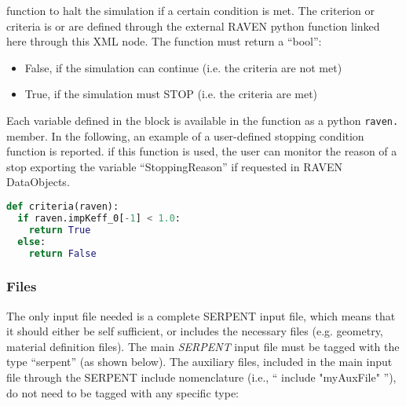 \begin{itemize}
                                                            function to halt the simulation if a certain condition is
                                                            met. The criterion or criteria is or are defined through the external RAVEN python function linked here through this XML node. 
                                                            The function must return a ``bool'':
                                                            \begin{itemize}
                                                              \item False, if the simulation can continue (i.e. the criteria are not met)
                                                              \item True, if the simulation must STOP (i.e. the criteria are met)
                                                            \end{itemize}
                                                            Each variable defined in the  block is available in the
                                                            function as a python \texttt{raven.} member. In the following, an example of a
                                                            user-defined stopping condition function is reported.
                                                            \nb if this function is used, the user can monitor the reason of a stop exporting the variable ``StoppingReason'' if requested in RAVEN DataObjects.
                                                            
\begin{lstlisting}[language=python]
def criteria(raven):
  if raven.impKeff_0[-1] < 1.0:
    return True
  else:
    return False
\end{lstlisting}

\end{itemize}

\subsubsection{Files}
The only input file needed is a complete SERPENT input file,
which means that it should either be self sufficient, or includes
the necessary files (e.g. geometry, material definition files).
The main \textit{SERPENT} input file must be tagged with the
type ``serpent'' (as shown below). The auxiliary files, included in the
main input file through the SERPENT include nomenclature (i.e., `` include "myAuxFile" ''),
do not need to be tagged with any specific type:

